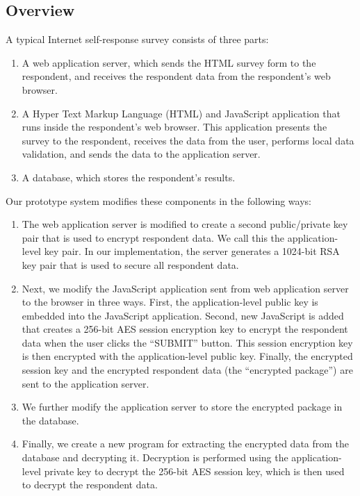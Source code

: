 \documentclass[fleqn,10pt]{wlscirep}
\begin{document}
\subsection{Overview}

A typical Internet self-response survey consists of three parts:

\begin{enumerate}
  \item A web application server, which sends the HTML survey form to
    the respondent, and receives the respondent data from the
    respondent's web browser.
  \item A Hyper Text Markup Language (HTML) and JavaScript application
    that runs inside the respondent's web browser. This application
    presents the survey to the respondent, receives the data from the user, performs
    local data validation, and sends the data to the application
    server.
  \item A database, which stores the respondent's results. 
\end{enumerate}

Our prototype system modifies these components in the following ways:

\begin{enumerate}
\item The web application server is modified to create a second
  public/private key pair that is used to encrypt respondent data. We
  call this the application-level key pair. In our implementation, the
  server generates a 1024-bit RSA key pair that is used to secure all
  respondent data.
\item Next, we modify the JavaScript application sent from web
  application server to the browser in three ways. First, the
  application-level public key is embedded into the JavaScript
  application. Second, new JavaScript is added that creates a 256-bit
  AES session encryption key to encrypt the respondent data when the user clicks the
  ``SUBMIT'' button. This session encryption key is then encrypted
  with the application-level public key. Finally, the encrypted
  session key and the encrypted respondent data (the ``encrypted
  package'') are sent to the
  application server.
\item We further modify the application server to store the encrypted
  package in the database.
\item Finally, we create a new program for extracting the encrypted
  data from the database and decrypting it. Decryption is performed
  using the application-level private key to decrypt the 256-bit AES
  session key, which is then used to decrypt the respondent data.
\end{enumerate}
\end{document}
